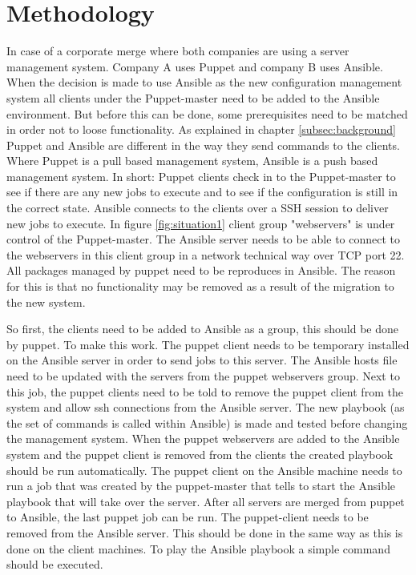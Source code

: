 \section{Methodology}\label{sec:methodology}


In case of a corporate merge where both companies are using a server management system. Company A uses Puppet and company B uses Ansible. When the decision is made to use Ansible as the new configuration management system all clients under the Puppet-master need to be added to the Ansible environment. But before this can be done, some prerequisites need to be matched in order not to loose functionality.
As explained in chapter \ref{subsec:background} Puppet and Ansible are different in the way they send commands to the clients. Where Puppet is a pull based management system, Ansible is a push based management system. In short: Puppet clients check in to the Puppet-master to see if there are any new jobs to execute and to see if the configuration is still in the correct state. Ansible connects to the clients over a SSH session to deliver new jobs to execute. In figure \ref{fig:situation1} client group "webservers" is under control of the Puppet-master. The Ansible server needs to be able to connect to the webservers in this client group in a network technical way over TCP port 22. All packages managed by puppet need to be reproduces in Ansible. The reason for this is that no functionality may be removed as a result of the migration to the new system. 

So first, the clients need to be added to Ansible as a group, this should be done by puppet. To make this work. The puppet client needs to be temporary installed on the Ansible server in order to send jobs to this server. The Ansible hosts file need to be updated with the servers from the puppet webservers group. Next to this job, the puppet clients need to be told to remove the puppet client from the system and allow ssh connections from the Ansible server. The new playbook (as the set of commands is called within Ansible) is made and tested before changing the management system. When the puppet webservers are added to the Ansible system and the puppet client is removed from the clients the created playbook should be run automatically. The puppet client on the Ansible machine needs to run a job that was created by the puppet-master that tells to start the Ansible playbook that will take over the server. After all servers are merged from puppet to Ansible, the last puppet job can be run. The puppet-client needs to be removed from the Ansible server. This should be done in the same way as this is done on the client machines. To play the Ansible playbook a simple command should be executed. 

